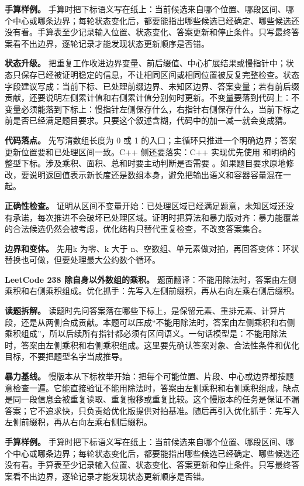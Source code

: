 \textbf{手算样例。} 手算时把下标语义写在纸上：当前候选来自哪个位置、哪段区间、哪个中心或哪条边界；每轮状态变化后，都要能指出哪些候选已经确定、哪些候选还没有看。手算表至少记录输入位置、状态变化、答案更新和停止条件。只写最终答案看不出边界，逐轮记录才能发现状态更新顺序是否错。

\textbf{状态升级。} 把重复工作收进边界变量、前后缀值、中心扩展结果或慢指针中；状态只保存已经被证明稳定的信息，不让相同区间或相同位置被反复完整检查。状态字段建议写成：当前下标、已处理前缀边界、未知区边界、答案变量；若有前后缀贡献，还要说明左侧累计值和右侧累计值分别何时更新。不变量要落到代码上：不变量必须能落到下标上：慢指针左侧保存什么，右指针右侧保存什么，当前下标之前是否已经满足题目要求。只要这个叙述含糊，代码中的加一减一就会变成猜。

\textbf{代码落点。} 先写清数组长度为 0 或 1 的入口；主循环只推进一个明确边界；答案更新位置要和已处理区间一致。C++ 侧还要落实：C++ 实现优先使用  和明确的整型下标。涉及乘积、面积、总和时要主动判断是否需要 。如果题目要求原地修改，要说明返回值表示新长度还是数组本身，避免把输出语义和容器容量混在一起。

\textbf{正确性检查。} 证明从区间不变量开始：已处理区域已经满足题意，未知区域还没有承诺，每次推进不会破坏已处理区域。证明时把算法和暴力版对齐：暴力能覆盖的合法候选仍然会被考虑，优化结构只替代重复检查，不改变答案集合。

\textbf{边界和变体。} 先用k 为零、k 大于 n、空数组、单元素做对拍，再回答变体：环状替换也可做，但要处理最大公约数个循环。

\noindent\textbf{LeetCode 238 除自身以外数组的乘积。} 题面翻译：不能用除法时，答案由左侧乘积和右侧乘积组成。优化抓手：先写入左侧前缀积，再从右向左乘右侧后缀积。

\textbf{读题拆解。} 读题时先问答案落在哪些下标上，是保留元素、重排元素、计算片段，还是从两侧合成贡献。本题可以压成“不能用除法时，答案由左侧乘积和右侧乘积组成”，所以后续所有指针都必须有区间语义。一句话模型是：不能用除法时，答案由左侧乘积和右侧乘积组成。这里要先确认答案对象、合法性条件和优化目标，不要把题型名字当成推导。

\textbf{暴力基线。} 慢版本从下标枚举开始：把每个可能位置、片段、中心或边界都按题意检查一遍。它能直接验证不能用除法时，答案由左侧乘积和右侧乘积组成，缺点是同一段信息会被重复读取、重复搬移或重复比较。这个慢版本的任务是保证不漏答案；它不追求快，只负责给优化版提供对拍基准。随后再引入优化抓手：先写入左侧前缀积，再从右向左乘右侧后缀积。

\textbf{手算样例。} 手算时把下标语义写在纸上：当前候选来自哪个位置、哪段区间、哪个中心或哪条边界；每轮状态变化后，都要能指出哪些候选已经确定、哪些候选还没有看。手算表至少记录输入位置、状态变化、答案更新和停止条件。只写最终答案看不出边界，逐轮记录才能发现状态更新顺序是否错。

